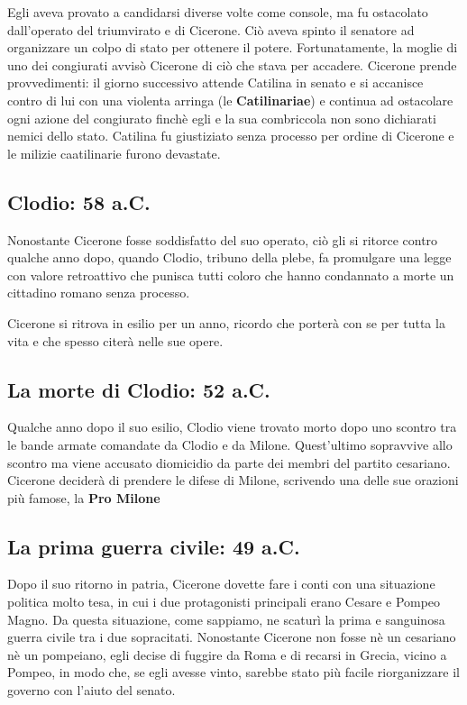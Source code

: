 \documentclass[10pt,a4paper]{article}
\begin{document}
 Egli aveva provato a candidarsi diverse volte come console, ma fu ostacolato dall'operato del triumvirato e di Cicerone. Ciò aveva spinto il senatore ad organizzare un colpo di stato per ottenere il potere. Fortunatamente, la moglie di uno dei congiurati avvisò Cicerone di ciò che stava per accadere. Cicerone prende provvedimenti: il giorno successivo attende Catilina in senato e si accanisce contro di lui con una violenta arringa (le \textbf{Catilinariae}) e continua ad ostacolare ogni azione del congiurato finchè egli e la sua combriccola non sono dichiarati nemici dello stato. Catilina fu giustiziato senza processo per ordine di Cicerone e le milizie caatilinarie furono devastate. 
 
 \subsection*{Clodio: 58 a.C.}
 
 Nonostante Cicerone fosse soddisfatto del suo operato, ciò gli si ritorce contro qualche anno dopo, quando Clodio, tribuno della plebe, fa promulgare una legge con valore retroattivo che punisca tutti coloro che hanno condannato a morte un cittadino romano senza processo.

Cicerone si ritrova in esilio per un anno, ricordo che porterà con se per tutta la vita e che spesso citerà nelle sue opere.

\subsection*{La morte di Clodio: 52 a.C.}

Qualche anno dopo il suo esilio, Clodio viene trovato morto dopo uno scontro tra le bande armate comandate da Clodio e da Milone. Quest'ultimo sopravvive allo scontro ma viene accusato diomicidio da parte dei membri del partito cesariano. Cicerone deciderà di prendere le difese di Milone, scrivendo una delle sue orazioni più famose, la \textbf{Pro Milone}

\subsection*{La prima guerra civile: 49 a.C.}

Dopo il suo ritorno in patria, Cicerone dovette fare i conti con una situazione politica molto tesa, in cui i due protagonisti principali erano Cesare e Pompeo Magno. Da questa situazione, come sappiamo, ne scaturì la prima e sanguinosa guerra civile tra i due sopracitati. Nonostante Cicerone non fosse nè un cesariano nè un pompeiano, egli decise di fuggire da Roma e di recarsi in Grecia, vicino a Pompeo, in modo che, se egli avesse vinto, sarebbe stato più facile riorganizzare il governo con l'aiuto del senato. 
\end{document}
